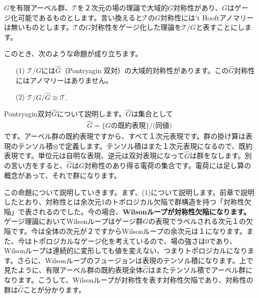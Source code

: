 \documentclass[report,paper=a4, fontsize=12pt, line_length=16cm, number_of_lines=33,dvipdfmx]{jlreq}
\newcommand{\kyou}[1]{{\sffamily \bfseries #1}}
\numberwithin{equation}{chapter}
\newcommand{\Gh}{\widehat{G}}
\newcommand{\Tcal}{\mathcal{T}}
\begin{document}
$G$を有限アーベル群、$\Tcal$を２次元の場の理論で大域的$G$対称性があり、$G$はゲージ化可能であるものとします。言い換えると$\Tcal$の$G$対称性には't Hooftアノマリーは無いものとします。$\Tcal$の$G$対称性をゲージ化した理論を$\Tcal/G$と表すことにします。

このとき、次のような命題が成り立ちます。
\begin{proposition}[命題]
  \begin{enumerate}
    \item[(1)] $\Tcal/G$には$\Gh$（Pontryagin 双対）の大域的対称性があります。この$\Gh$対称性にはアノマリーはありません。
    \item[(2)] $\Tcal/G/\Gh \cong \Tcal.$
  \end{enumerate}      
\end{proposition}
Pontryagin双対$\Gh$について説明します。$\Gh$は集合として
\begin{align}
  \Gh=\{G\text{の既約表現}\}/\text{(同値)}
\end{align}
です。アーベル群の既約表現ですから、すべて１次元表現です。群の掛け算は表現のテンソル積$\otimes$で定義します。テンソル積はまた１次元表現になるので、既約表現です。単位元は自明な表現、逆元は双対表現になって$\Gh$は群をなします。別の言い方をすると、$\Gh$は$G$対称性のあり得る電荷の集合です。電荷には足し算の概念があって、それで群になります。

この命題について説明していきます。まず、(1)について説明します。前章で説明したとおり、対称性とは余次元1のトポロジカル欠陥で群構造を持つ「対称性欠陥」で表されるのでした。今の場合、\kyou{Wilsonループが対称性欠陥になります。}ゲージ理論においてWilsonループはゲージ群$G$の表現でラベルされる次元１の欠陥です。今は全体の次元が２ですからWilsonループの余次元は１になります。また、今はトポロジカルなゲージ化を考えているので、場の強さは$0$であり、Wilsonループは連続的に変形しても値を変えない、つまりトポロジカルになります。さらに、Wilsonループのフュージョンは表現のテンソル積になります。上で見たように、有限アーベル群の既約表現全体$\Gh$はまたテンソル積でアーベル群になります。こうして、Wilsonループが対称性を表す対称性欠陥であり、対称性の群は$\Gh$ことが分かります。
\end{document}
